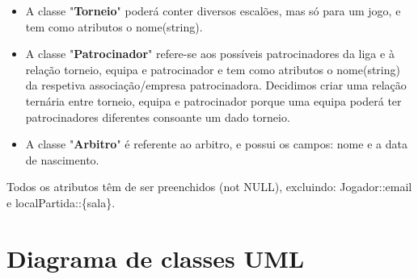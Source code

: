 \documentclass[a4paper]{article}
\begin{document}
\begin{itemize}
\item A classe "\textbf{Torneio}" poderá conter diversos escalões, mas só para um jogo, e tem como atributos o nome(string).

\item A classe "\textbf{Patrocinador}" refere-se aos possíveis patrocinadores da liga e à relação torneio, equipa e patrocinador e tem como atributos o nome(string) da respetiva associação/empresa patrocinadora. Decidimos criar uma relação ternária entre torneio, equipa e patrocinador porque uma equipa poderá ter patrocinadores diferentes consoante um dado torneio.

\item A classe "\textbf{Arbitro}" é referente ao arbitro, e possui os campos: nome e a data de nascimento.
\end{itemize}

Todos os atributos têm de ser preenchidos (not NULL), excluindo: Jogador::email e localPartida::\{sala\}.


\section{Diagrama de classes UML}


\clearpage
{}
\renewcommand\refname{Bibliografia}


\end{document}
